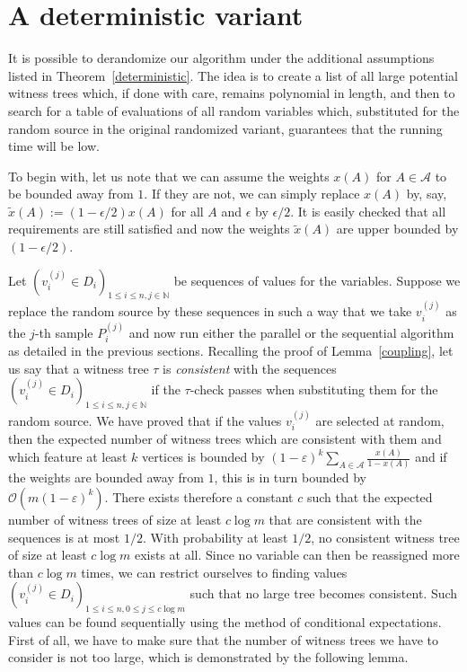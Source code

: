 \documentclass[11pt,a4paper]{article}
\begin{document}
\section{A deterministic variant}

It is possible to derandomize our algorithm under the additional
assumptions listed in Theorem~\ref{deterministic}. The idea is to create 
a list of all large potential witness trees which, if done with care, 
remains polynomial in length, and then to search for a table of evaluations 
of all random variables which, substituted for the random source in the original 
randomized variant, guarantees that the running time will be low.

To begin with, let us note that we can assume the weights $x(A)$ for
$A \in \mathcal{A}$ to be bounded away from $1$. If they are not, we can
simply replace $x(A)$ by, say, $\tilde x(A) := (1-\epsilon/2)x(A)$ for all
$A$ and $\epsilon$ by $\epsilon/2$. It is easily checked that all 
requirements are still satisfied and now the weights $\tilde x(A)$ are
upper bounded by $(1-\epsilon/2)$.

Let $(v_i^{(j)} \in D_i)_{1 \le i \le n, j \in \mathbb{N}}$ be sequences of values for the 
variables. Suppose we replace the random source by these sequences in such a way that
we take $v_i^{(j)}$ as the $j$-th sample $P_i^{(j)}$ and now run either the parallel or
the sequential algorithm as detailed in the previous sections. Recalling the proof of
Lemma~\ref{coupling}, let us say that a witness tree $\tau$ is \emph{consistent} with
the sequences $(v_i^{(j)} \in D_i)_{1 \le i \le n, j \in \mathbb{N}}$ if the $\tau$-check
passes when substituting them for the random source. We have proved that if the values
$v_i^{(j)}$ are selected at random, then the expected number of witness trees which are
consistent with them and which feature at least $k$ vertices is bounded by 
$(1-\varepsilon)^k\sum_{A\in\mathcal A}\frac{x(A)}{1-x(A)}$
and if the weights are bounded away from $1$, this is in turn bounded by
$\mathcal{O}(m(1-\varepsilon)^k)$. There exists therefore a constant $c$ such that
the expected number of witness trees of size at least $c \log m$ that are 
consistent with the sequences is at most $1/2$. With probability at least $1/2$, 
no consistent witness tree of size at least $c \log m$ exists at all.
Since no variable can then be reassigned more than $c \log m$ times, we can restrict ourselves to
finding values $(v_i^{(j)} \in D_i)_{1 \le i \le n, 0 \le j \le c \log m}$ such
that no large tree becomes consistent. Such values can be found sequentially
using the method of conditional expectations. First of all, we have to make sure
that the number of witness trees we have to consider is not too large, which is
demonstrated by the following lemma.
\end{document}

